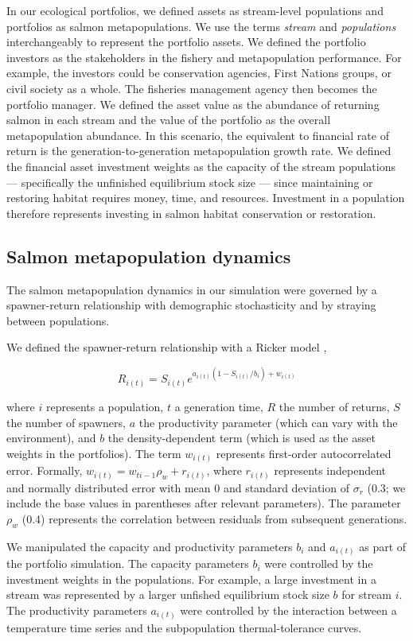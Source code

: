 In our ecological portfolios, we defined assets as stream-level populations and portfolios as salmon metapopulations. We use the terms \emph{stream} and \emph{populations} interchangeably to represent the portfolio assets. We defined the portfolio investors as the stakeholders in the fishery and metapopulation performance. For example, the investors could be conservation agencies, First Nations groups, or civil society as a whole. The fisheries management agency then becomes the portfolio manager. We defined the asset value as the abundance of returning salmon in each stream and the value of the portfolio as the overall metapopulation abundance. In this scenario, the equivalent to financial rate of return is the generation-to-generation metapopulation growth rate. We defined the financial asset investment weights as the capacity of the stream populations --- specifically the unfinished equilibrium stock size --- since maintaining or restoring habitat requires money, time, and resources. Investment in a population therefore represents investing in salmon habitat conservation or restoration.

\subsection{Salmon metapopulation dynamics}

The salmon metapopulation dynamics in our simulation were governed by a spawner-return relationship with demographic stochasticity and by straying between populations.

We defined the spawner-return relationship with a Ricker model \citep{ricker1954},

\[R_{i(t)} = S_{i(t)}e^{a_{i(t)}(1-S_{i(t)}/b_i) + w_{i(t)}}\]

where $i$ represents a population, $t$ a generation time, $R$ the number of returns, $S$ the number of spawners, $a$ the productivity parameter (which can vary with the environment), and $b$ the density-dependent term (which is used as the asset weights in the portfolios). The term $w_{i(t)}$ represents first-order autocorrelated error. Formally, $w_{i(t)} = w_{ti-1} \rho_w + r_{i(t)}$, where $r_{i(t)}$ represents independent and normally distributed error with mean 0 and standard deviation of $\sigma_r$ (0.3; we include the base values in parentheses after relevant parameters). The parameter $\rho_w$ (0.4) represents the correlation between residuals from subsequent generations.

We manipulated the capacity and productivity parameters $b_i$ and $a_{i(t)}$ as part of the portfolio simulation. The capacity parameters $b_i$ were controlled by the investment weights in the populations. For example, a large investment in a stream was represented by a larger unfished equilibrium stock size $b$ for stream $i$. The productivity parameters $a_{i(t)}$ were controlled by the interaction between a temperature time series and the subpopulation thermal-tolerance curves.

